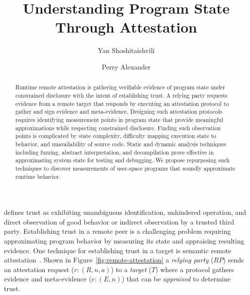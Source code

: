 \documentclass[runningheads]{llncs}
\begin{document}
%
\title{Understanding Program State Through Attestation}
%
%
\author{Yan Shoshitaishvili \and Perry Alexander}
%
%
%
\maketitle              %
%
\begin{abstract}
Runtime remote attestation is gathering verifiable evidence of program state under constrained
disclosure with the intent of establishing trust. A relying party requests evidence from a
remote target that responds by executing an attestation protocol to gather and
sign evidence and meta-evidence.  Designing
such attestation protocols requires identifying measurement points in program state
that provide meaningful approximations while respecting constrained disclosure.
Finding such observation points is complicated by state complexity, difficulty
mapping execution state to behavior, and unavailability of source code.  Static
and dynamic analysis techniques including fuzzing, abstract
interpretation, and decompilation prove effective in approximating system state
for testing and debugging.  We propose repurposing such techniques to discover
measurements of user-space programs that soundly approximate runtime behavior.

\end{abstract}
%
%
%


\citet{Martin:08:The-ten-page-in} defines trust
as exhibiting unambiguous identification, unhindered operation, and direct
observation of good behavior or indirect observation by a trusted third party. Establishing trust in a remote peer is a challenging problem requiring
approximating program behavior by measuring its state and appraising resulting
evidence. One technique for establishing trust in a target is semantic
remote attestation~\citep{Haldar:04:Semantic-Remote,Coker::Principles-of-R}.
Shown in Figure~\ref{fig:remote-attestation} a \emph{relying party} ($RP$) sends
an attestation request ($r:(R,n,a)$) to a \emph{target} ($T$) where a protocol gathers evidence and meta-evidence ($e:(E,n)$) that can be \emph{appraised} to determine trust.
\end{document}
